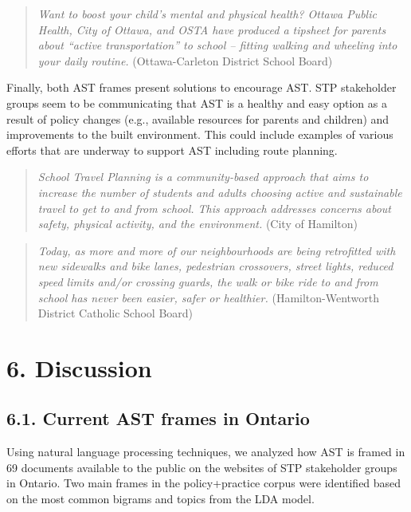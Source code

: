 \documentclass[]{elsarticle} %
\begin{document}
\begin{quote}
\emph{Want to boost your child's mental and physical health? Ottawa
Public Health, City of Ottawa, and OSTA have produced a tipsheet for
parents about ``active transportation'' to school -- fitting walking and
wheeling into your daily routine.} (Ottawa-Carleton District School
Board)
\end{quote}

Finally, both AST frames present solutions to encourage AST. STP
stakeholder groups seem to be communicating that AST is a healthy and
easy option as a result of policy changes (e.g., available resources for
parents and children) and improvements to the built environment. This
could include examples of various efforts that are underway to support
AST including route planning.

\begin{quote}
\emph{School Travel Planning is a community-based approach that aims to
increase the number of students and adults choosing active and
sustainable travel to get to and from school. This approach addresses
concerns about safety, physical activity, and the environment.} (City of
Hamilton)
\end{quote}

\begin{quote}
\emph{Today, as more and more of our neighbourhoods are being
retrofitted with new sidewalks and bike lanes, pedestrian crossovers,
street lights, reduced speed limits and/or crossing guards, the walk or
bike ride to and from school has never been easier, safer or healthier.}
(Hamilton-Wentworth District Catholic School Board)
\end{quote}

\hypertarget{discussion}{%
\section{6. Discussion}\label{discussion}}

\hypertarget{current-ast-frames-in-ontario}{%
\subsection{6.1. Current AST frames in
Ontario}\label{current-ast-frames-in-ontario}}

Using natural language processing techniques, we analyzed how AST is
framed in 69 documents available to the public on the websites of STP
stakeholder groups in Ontario. Two main frames in the policy+practice
corpus were identified based on the most common bigrams and topics from
the LDA model.
\end{document}
